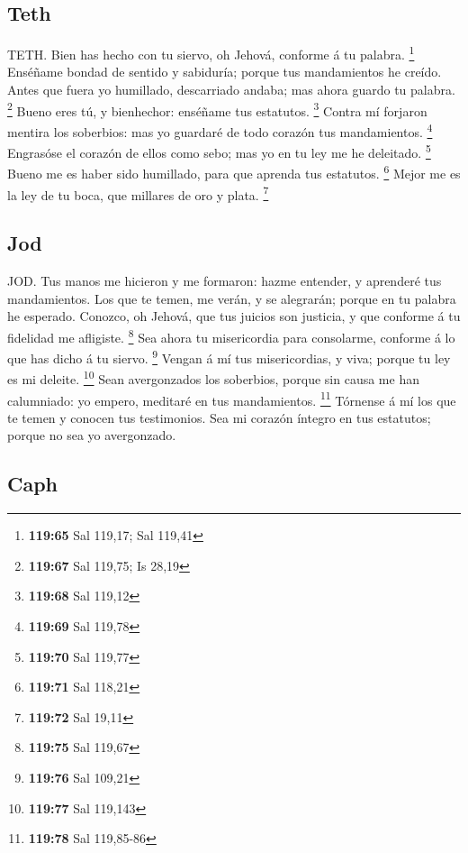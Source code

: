 \hypertarget{teth}{%
\subsection{Teth}\label{teth}}

 TETH. Bien has hecho con tu siervo, oh Jehová, conforme á
tu palabra. \footnote{\textbf{119:65} Sal 119,17; Sal 119,41}
 Enséñame bondad de sentido y sabiduría; porque tus
mandamientos he creído.  Antes que fuera yo humillado,
descarriado andaba; mas ahora guardo tu palabra. \footnote{\textbf{119:67}
  Sal 119,75; Is 28,19}  Bueno eres tú, y bienhechor:
enséñame tus estatutos. \footnote{\textbf{119:68} Sal 119,12}
 Contra mí forjaron mentira los soberbios: mas yo guardaré
de todo corazón tus mandamientos. \footnote{\textbf{119:69} Sal 119,78}
 Engrasóse el corazón de ellos como sebo; mas yo en tu ley
me he deleitado. \footnote{\textbf{119:70} Sal 119,77} 
Bueno me es haber sido humillado, para que aprenda tus estatutos.
\footnote{\textbf{119:71} Sal 118,21}  Mejor me es la ley
de tu boca, que millares de oro y plata. \footnote{\textbf{119:72} Sal
  19,11}

\hypertarget{jod}{%
\subsection{Jod}\label{jod}}

 JOD. Tus manos me hicieron y me formaron: hazme entender,
y aprenderé tus mandamientos.  Los que te temen, me verán,
y se alegrarán; porque en tu palabra he esperado.  Conozco,
oh Jehová, que tus juicios son justicia, y que conforme á tu fidelidad
me afligiste. \footnote{\textbf{119:75} Sal 119,67}  Sea
ahora tu misericordia para consolarme, conforme á lo que has dicho á tu
siervo. \footnote{\textbf{119:76} Sal 109,21}  Vengan á mí
tus misericordias, y viva; porque tu ley es mi deleite. \footnote{\textbf{119:77}
  Sal 119,143}  Sean avergonzados los soberbios, porque sin
causa me han calumniado: yo empero, meditaré en tus mandamientos.
\footnote{\textbf{119:78} Sal 119,85-86}  Tórnense á mí los
que te temen y conocen tus testimonios.  Sea mi corazón
íntegro en tus estatutos; porque no sea yo avergonzado.

\hypertarget{caph}{%
\subsection{Caph}\label{caph}}

